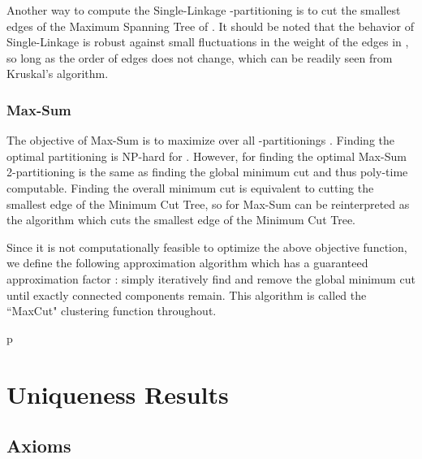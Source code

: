 \documentclass[twoside,11pt]{article}
\begin{document}
Another way to compute the Single-Linkage -partitioning is to cut the  smallest edges of the Maximum Spanning Tree of  \citep{mstsl}. It should be noted that the behavior of Single-Linkage is robust against small fluctuations in the weight of the edges in , so long as the order of edges does not change, which can be readily seen from Kruskal's algorithm. 

\subsubsection{Max-Sum}

The objective of Max-Sum is to maximize  over all -partitionings . 
Finding the optimal partitioning is NP-hard for . However, for  finding the optimal Max-Sum 2-partitioning is the same as finding the global  minimum cut and thus poly-time computable. Finding the overall minimum cut is equivalent to cutting the smallest edge of the Minimum Cut Tree, so for  Max-Sum can be reinterpreted as the algorithm which cuts the smallest edge of the Minimum Cut Tree.

Since it is not computationally feasible to optimize the above objective function, we define the following approximation algorithm which has a guaranteed approximation factor  \citep{vaziranibook}: simply iteratively find and remove the global minimum cut until exactly  connected components remain. This algorithm is called the ``MaxCut" clustering function throughout.

\begin{comment}
\algsetup{indent=2em}
\newcommand{\MaxSum}{\ensuremath{\mbox{\sc MaxSum}}}
\begin{algorithm}[h!]
\caption{}\label{alg:MS}
\begin{algorithmic} [4]
\STATE Input: .
\STATE Output: The Max-Sum -partitioning.
\medskip
\STATE 
\STATE 
\WHILE{}
	\STATE Let C be the global minimum cut in any component of 
	\STATE remove C from G
	\STATE 
\ENDWHILE
\STATE Output the connected components of 
\end{algorithmic}
\end{algorithm}
\end{comment}p

\section{Uniqueness Results}

\subsection{Axioms}
\end{document}
